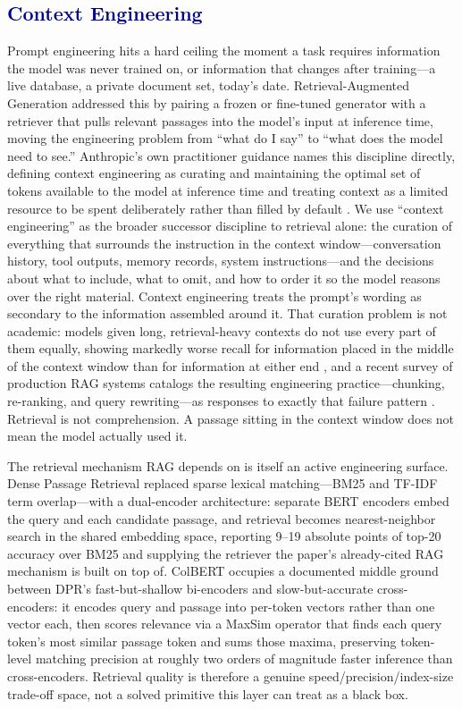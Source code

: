 \documentclass[journal]{IEEEtran}
\begin{document}
\subsection{\textcolor{darkblue}{Context Engineering}}

Prompt engineering hits a hard ceiling the moment a task requires information the model was never trained on, or information that changes after training---a live database, a private document set, today's date. Retrieval-Augmented Generation \cite{lewis2020retrieval} addressed this by pairing a frozen or fine-tuned generator with a retriever that pulls relevant passages into the model's input at inference time, moving the engineering problem from ``what do I say'' to ``what does the model need to see.'' Anthropic's own practitioner guidance names this discipline directly, defining context engineering as curating and maintaining the optimal set of tokens available to the model at inference time and treating context as a limited resource to be spent deliberately rather than filled by default \cite{anthropic2025context}. We use ``context engineering'' as the broader successor discipline to retrieval alone: the curation of everything that surrounds the instruction in the context window---conversation history, tool outputs, memory records, system instructions---and the decisions about what to include, what to omit, and how to order it so the model reasons over the right material. Context engineering treats the prompt's wording as secondary to the information assembled around it. That curation problem is not academic: models given long, retrieval-heavy contexts do not use every part of them equally, showing markedly worse recall for information placed in the middle of the context window than for information at either end \cite{liu2023lost}, and a recent survey of production RAG systems catalogs the resulting engineering practice---chunking, re-ranking, and query rewriting---as responses to exactly that failure pattern \cite{gao2023retrieval}. Retrieval is not comprehension. A passage sitting in the context window does not mean the model actually used it.

The retrieval mechanism RAG depends on is itself an active engineering surface. Dense Passage Retrieval \cite{karpukhin2020dense} replaced sparse lexical matching---BM25 and TF-IDF term overlap---with a dual-encoder architecture: separate BERT encoders embed the query and each candidate passage, and retrieval becomes nearest-neighbor search in the shared embedding space, reporting 9--19 absolute points of top-20 accuracy over BM25 and supplying the retriever the paper's already-cited RAG mechanism is built on top of. ColBERT \cite{khattab2020colbert} occupies a documented middle ground between DPR's fast-but-shallow bi-encoders and slow-but-accurate cross-encoders: it encodes query and passage into per-token vectors rather than one vector each, then scores relevance via a MaxSim operator that finds each query token's most similar passage token and sums those maxima, preserving token-level matching precision at roughly two orders of magnitude faster inference than cross-encoders. Retrieval quality is therefore a genuine speed/precision/index-size trade-off space, not a solved primitive this layer can treat as a black box.
\end{document}
